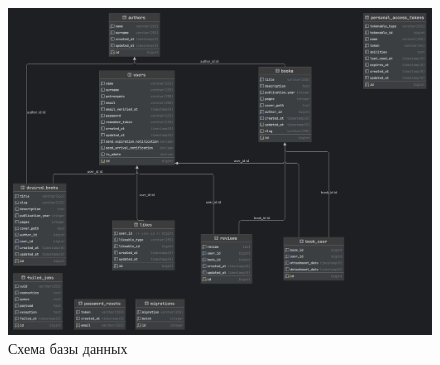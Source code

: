 \documentclass[project.tex]{subfiles}
\begin{document}
\begin{figure}[H]
   \label{pic}
   \includegraphics[width=\textwidth]{../../graphics/lms_db.png}
   \caption{Схема базы данных} 
\end{figure}
\end{document}
